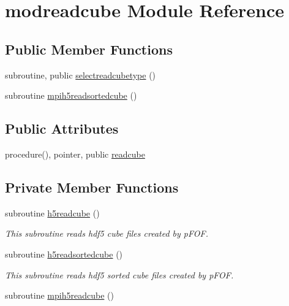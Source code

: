 \hypertarget{classmodreadcube}{\section{modreadcube Module Reference}
\label{classmodreadcube}
}
\subsection*{Public Member Functions}
\begin{DoxyCompactItemize}
\item 
subroutine, public \hyperlink{classmodreadcube_a4a766e844f098b280fdd9b43f4ba1f08}{selectreadcubetype} ()
\item 
subroutine \hyperlink{classmodreadcube_afc147b0f2e67c88cc8d7d0dd06ae8ff7}{mpih5readsortedcube} ()
\end{DoxyCompactItemize}
\subsection*{Public Attributes}
\begin{DoxyCompactItemize}
\item 
procedure(), pointer, public \hyperlink{classmodreadcube_a29b15033a5a22b6885adfeec6dc59423}{readcube}
\end{DoxyCompactItemize}
\subsection*{Private Member Functions}
\begin{DoxyCompactItemize}
\item 
subroutine \hyperlink{classmodreadcube_a9b00396dd9eab642a275a7aa06d9cd20}{h5readcube} ()
\begin{DoxyCompactList}\small\item\em This subroutine reads hdf5 cube files created by p\-F\-O\-F. \end{DoxyCompactList}\item 
subroutine \hyperlink{classmodreadcube_a30050fd5631222b0125e7917cc8ae547}{h5readsortedcube} ()
\begin{DoxyCompactList}\small\item\em This subroutine reads hdf5 sorted cube files created by p\-F\-O\-F. \end{DoxyCompactList}\item 
subroutine \hyperlink{classmodreadcube_af92f4077b7cf70887bb67a38909f1a27}{mpih5readcube} ()
\end{DoxyCompactItemize}



